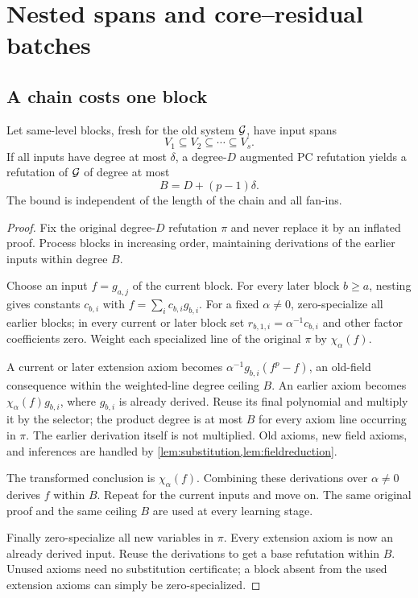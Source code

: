\chapter{Nested spans and core--residual batches}\label{ch:batching}

\section{A chain costs one block}
\begin{theorem}\label{thm:nested}
Let same-level blocks, fresh for the old system $\mathcal G$, have input spans
\[
 V_1\subseteq V_2\subseteq\cdots\subseteq V_s.
\]
If all inputs have degree at most $\delta$, a degree-$D$ augmented PC refutation yields a refutation of $\mathcal G$ of degree at most
\[
 \boxed{B=D+(p-1)\delta.}
\]
The bound is independent of the length of the chain and all fan-ins.
\end{theorem}
\begin{proof}
Fix the original degree-$D$ refutation $\pi$ and never replace it by an inflated proof. Process blocks in increasing order, maintaining derivations of the earlier inputs within degree $B$.

Choose an input $f=g_{a,j}$ of the current block. For every later block $b\ge a$, nesting gives constants $c_{b,i}$ with $f=\sum_i c_{b,i}g_{b,i}$. For a fixed $\alpha\ne0$, zero-specialize all earlier blocks; in every current or later block set $r_{b,1,i}=\alpha^{-1}c_{b,i}$ and other factor coefficients zero. Weight each specialized line of the original $\pi$ by $\chi_\alpha(f)$.

A current or later extension axiom becomes
$\alpha^{-1}g_{b,i}(f^p-f)$, an old-field consequence within the weighted-line degree ceiling $B$. An earlier axiom becomes $\chi_\alpha(f)g_{b,i}$, where $g_{b,i}$ is already derived. Reuse its final polynomial and multiply it by the selector; the product degree is at most $B$ for every axiom line occurring in $\pi$. The earlier derivation itself is not multiplied. Old axioms, new field axioms, and inferences are handled by \cref{lem:substitution,lem:fieldreduction}.

The transformed conclusion is $\chi_\alpha(f)$. Combining these derivations over $\alpha\ne0$ derives $f$ within $B$. Repeat for the current inputs and move on. The same original proof and the same ceiling $B$ are used at every learning stage.

Finally zero-specialize all new variables in $\pi$. Every extension axiom is now an already derived input. Reuse the derivations to get a base refutation within $B$. Unused axioms need no substitution certificate; a block absent from the used extension axioms can simply be zero-specialized.
\end{proof}

